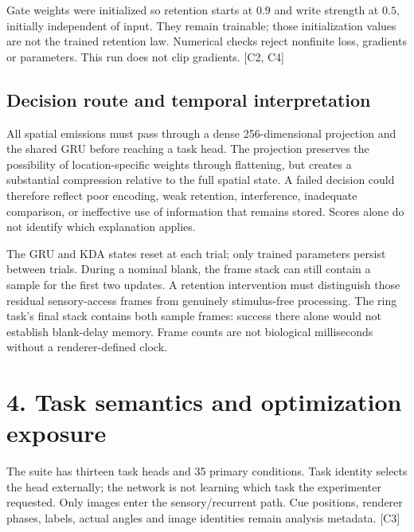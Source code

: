 \documentclass[
  10pt,
]{article}
\begin{document}
Gate weights were initialized so retention starts at \(0.9\) and write
strength at \(0.5\), initially independent of input. They remain
trainable; those initialization values are not the trained retention
law. Numerical checks reject nonfinite loss, gradients or parameters.
This run does not clip gradients. {[}C2, C4{]}

\subsection{Decision route and temporal
interpretation}\label{decision-route-and-temporal-interpretation}

All spatial emissions must pass through a dense 256-dimensional
projection and the shared GRU before reaching a task head. The
projection preserves the possibility of location-specific weights
through flattening, but creates a substantial compression relative to
the full spatial state. A failed decision could therefore reflect poor
encoding, weak retention, interference, inadequate comparison, or
ineffective use of information that remains stored. Scores alone do not
identify which explanation applies.

The GRU and KDA states reset at each trial; only trained parameters
persist between trials. During a nominal blank, the frame stack can
still contain a sample for the first two updates. A retention
intervention must distinguish those residual sensory-access frames from
genuinely stimulus-free processing. The ring task's final stack contains
both sample frames: success there alone would not establish blank-delay
memory. Frame counts are not biological milliseconds without a
renderer-defined clock.

\newpage

\section{4. Task semantics and optimization
exposure}\label{task-semantics-and-optimization-exposure}

The suite has thirteen task heads and 35 primary conditions. Task
identity selects the head externally; the network is not learning which
task the experimenter requested. Only images enter the sensory/recurrent
path. Cue positions, renderer phases, labels, actual angles and image
identities remain analysis metadata. {[}C3{]}
\end{document}
